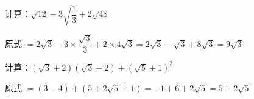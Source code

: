 \documentclass[a4paper,12pt]{ctexart}
\begin{document}



\begin{example}
计算：$\sqrt{12}-3\sqrt{\dfrac{1}{3}}+2\sqrt{48}$
\end{example}
\begin{solution}
原式 $=2\sqrt{3}-3\times\dfrac{\sqrt{3}}{3}+2\times4\sqrt{3}=2\sqrt{3}-\sqrt{3}+8\sqrt{3}=9\sqrt{3}$
\end{solution}

\begin{example}
计算：$(\sqrt{3}+2)(\sqrt{3}-2)+(\sqrt{5}+1)^2$
\end{example}
\begin{solution}
原式 $=(3-4)+(5+2\sqrt{5}+1)=-1+6+2\sqrt{5}=5+2\sqrt{5}$
\end{solution}

\end{document}
